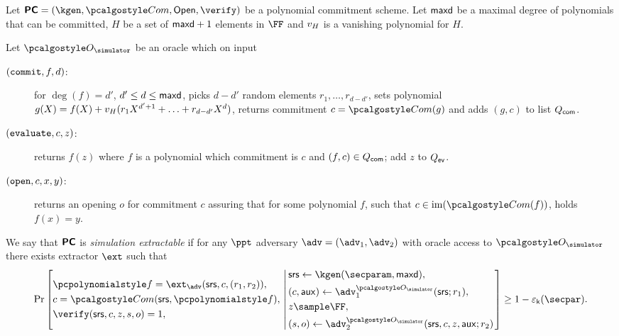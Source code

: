 \documentclass[runningheads,11pt]{llncs}
\begin{document}
\begin{definition}
  \label{def:sepcom}
  Let $\PCOM = (\kgen, \com, \open, \verify)$ be a polynomial commitment
  scheme. Let $\mathsf{maxd}$ be a maximal degree of polynomials that can be
  committed, $H$ be a set of $\mathsf{maxd} + 1$ elements in $\FF$ and
  $v_{H}$ is a vanishing polynomial for $H$.
  
  Let $\oracles$ be an oracle which on input
  \begin{description}
\item[$(\mathtt{commit}, f, d)$:] for $\deg(f) = d'$, $d' \leq d \leq \mathsf{maxd}$,
  picks $d - d'$ random elements $r_1, \ldots, r_{d - d'}$, sets 
  polynomial $g(X) = f(X) + v_{H}(r_1 X^{d' + 1} + \ldots + r_{d - d'} X^{d})$, returns
  commitment $c = \com(g)$ and adds $(g, c)$ to list $Q_{\mathsf{com}}$.
  \item[$(\mathtt{evaluate}, c, z)$:] returns $f(z)$ where $f$ is a polynomial
    which commitment is $c$ and $(f, c) \in Q_{\mathsf{com}}$; add $z$ to $Q_{\mathsf{ev}}$.
  \item[$(\mathtt{open}, c, x, y)$:] returns an opening $o$ for commitment $c$
    assuring that for some polynomial $f$, such that $c \in \image(\com(f))$,
    holds $f(x) = y$.
  \end{description}
  We say that $\bm{\mathsf{PC}}$ is \emph{simulation extractable} if for any $\ppt$
  adversary $\adv = (\adv_1, \adv_2)$ with oracle access to $\oracles$ there
  exists extractor $\ext$ such that
\[
  \Pr \left[
    \begin{aligned}
      & \p{f} = \ext_\adv(\srs, c, (r_1, r_2)),\\
      & c = \com(\srs, \p{f}),\\
      & \verify(\srs, c, z, s, o) = 1,
    \end{aligned}
    \,\left|\,
      \vphantom{
        \begin{aligned}
          & \\
          & \\
          & \\
          &
        \end{aligned}
        }
    \begin{aligned}
      & \srs \gets \kgen(\secparam, \maxdeg),\\
      & (c, \aux) \gets \adv_1^{\oracles}(\srs; r_1), \\
      & z \sample \FF, \\
      & (s, o) \gets \adv_2^{\oracles}(\srs, c, z, \aux; r_2)
    \end{aligned}
  \right.\right]
  \geq 1 - \epsk(\secpar).
\]
\end{definition}
\end{document}

